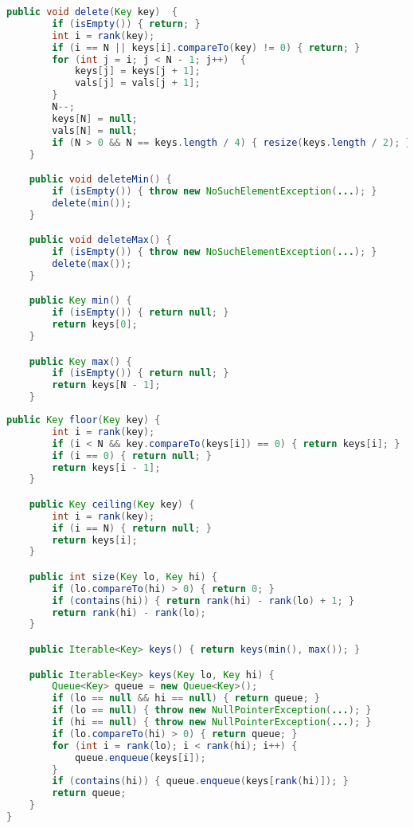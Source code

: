\documentclass[8pt,a4paper,compress]{beamer}
\begin{document}
\begin{frame}[fragile]
\begin{lstlisting}[language=Java]
    public void delete(Key key)  {
        if (isEmpty()) { return; }
        int i = rank(key);
        if (i == N || keys[i].compareTo(key) != 0) { return; }
        for (int j = i; j < N - 1; j++)  {
            keys[j] = keys[j + 1];
            vals[j] = vals[j + 1];
        }
        N--;
        keys[N] = null; 
        vals[N] = null;
        if (N > 0 && N == keys.length / 4) { resize(keys.length / 2); }
    } 

    public void deleteMin() {
        if (isEmpty()) { throw new NoSuchElementException(...); }
        delete(min());
    }

    public void deleteMax() {
        if (isEmpty()) { throw new NoSuchElementException(...); }
        delete(max());
    }

    public Key min() {
        if (isEmpty()) { return null; }
        return keys[0]; 
    }

    public Key max() {
        if (isEmpty()) { return null; }
        return keys[N - 1];
    }
\end{lstlisting}
\end{frame}

\begin{frame}[fragile]
\begin{lstlisting}[language=Java]
    public Key floor(Key key) {
        int i = rank(key);
        if (i < N && key.compareTo(keys[i]) == 0) { return keys[i]; }
        if (i == 0) { return null; }
        return keys[i - 1];
    }

    public Key ceiling(Key key) {
        int i = rank(key);
        if (i == N) { return null; }
        return keys[i];
    }

    public int size(Key lo, Key hi) {
        if (lo.compareTo(hi) > 0) { return 0; }
        if (contains(hi)) { return rank(hi) - rank(lo) + 1; }
        return rank(hi) - rank(lo);
    }

    public Iterable<Key> keys() { return keys(min(), max()); }

    public Iterable<Key> keys(Key lo, Key hi) {
        Queue<Key> queue = new Queue<Key>(); 
        if (lo == null && hi == null) { return queue; }
        if (lo == null) { throw new NullPointerException(...); }
        if (hi == null) { throw new NullPointerException(...); }
        if (lo.compareTo(hi) > 0) { return queue; }
        for (int i = rank(lo); i < rank(hi); i++) {
            queue.enqueue(keys[i]);
        }
        if (contains(hi)) { queue.enqueue(keys[rank(hi)]); }
        return queue; 
    }    
}
\end{lstlisting}
\end{frame}
\end{document}
